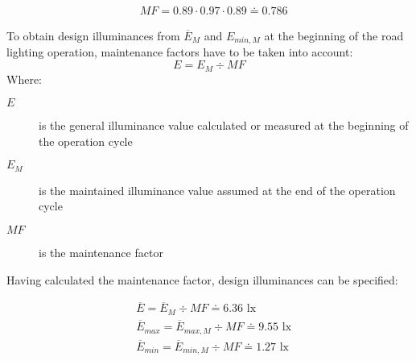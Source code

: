 \begin{align}
&MF = 0.89 \cdot 0.97 \cdot 0.89 \doteq 0.786
\end{align}

To obtain design illuminances from $\overline{E}_{M}$ and $E_{min,M}$ at the beginning of the road lighting operation, maintenance factors have to be taken into account:
\begin{equation}
E = E_{M} \div MF
\end{equation}
Where:
\begin{description}
	\item[$E$] is the general illuminance value calculated or measured at the beginning of the operation cycle
	\item[$E_{M}$] is the maintained illuminance value assumed at the end of the operation cycle
	\item[$MF$] is the maintenance factor
\end{description}

Having calculated the maintenance factor, design illuminances can be specified:

\begin{align}
&\overline{E} = \overline{E}_{M} \div MF \doteq 6.36 \text{ lx}\\
&\overline{E}_{max} = \overline{E}_{max,M} \div MF \doteq 9.55 \text{ lx}\\
&\overline{E}_{min} = \overline{E}_{min,M} \div MF \doteq 1.27 \text{ lx}\\
\end{align}
